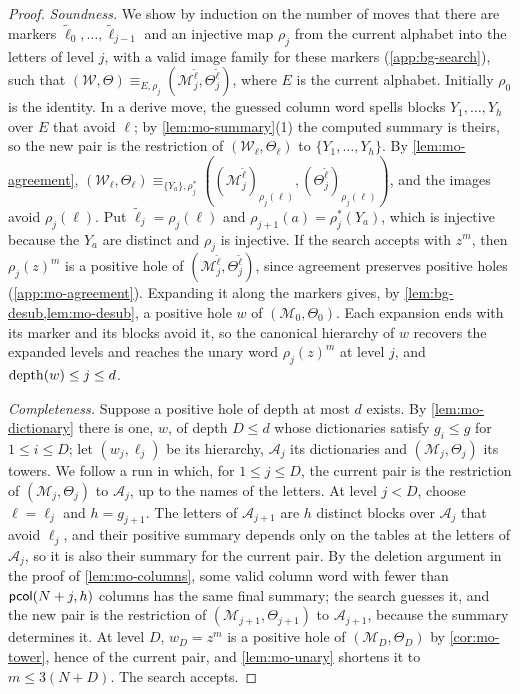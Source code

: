 \begin{proof}
\emph{Soundness.} We show by induction on the number of moves that there are
markers $\widetilde\ell_0,\ldots,\widetilde\ell_{j-1}$ and an injective map
$\rho_j$ from the current alphabet into the letters of level $j$, with a valid
image family for these markers (\cref{app:bg-search}), such that
$(\mathcal W,\Theta)\equiv_{E,\rho_j}(\mathcal M^{\widetilde{\boldsymbol\ell}}_j,
\Theta^{\widetilde{\boldsymbol\ell}}_j)$, where $E$ is the current alphabet.
Initially $\rho_0$ is the identity. In a derive move, the guessed column word
spells blocks $Y_1,\ldots,Y_h$ over $E$ that avoid $\ell$; by
\cref{lem:mo-summary}(1) the computed summary is theirs, so the new pair is the
restriction of $(\mathcal W_\ell,\Theta_\ell)$ to $\{Y_1,\ldots,Y_h\}$. By
\cref{lem:mo-agreement},
$(\mathcal W_\ell,\Theta_\ell)\equiv_{\{Y_a\},\rho_j^*}
((\mathcal M^{\widetilde{\boldsymbol\ell}}_j)_{\rho_j(\ell)},
(\Theta^{\widetilde{\boldsymbol\ell}}_j)_{\rho_j(\ell)})$, and the images avoid
$\rho_j(\ell)$. Put $\widetilde\ell_j=\rho_j(\ell)$ and
$\rho_{j+1}(a)=\rho_j^*(Y_a)$, which is injective because the $Y_a$ are
distinct and $\rho_j$ is injective. If the search accepts with $z^m$, then
$\rho_j(z)^m$ is a positive hole of $(\mathcal M^{\widetilde{\boldsymbol\ell}}_j,
\Theta^{\widetilde{\boldsymbol\ell}}_j)$, since agreement preserves positive
holes (\cref{app:mo-agreement}). Expanding it along the markers gives, by
\cref{lem:bg-desub,lem:mo-desub}, a positive hole $w$ of
$(\mathcal M_0,\Theta_0)$. Each expansion ends with its marker and its blocks
avoid it, so the canonical hierarchy of $w$ recovers the expanded levels and
reaches the unary word $\rho_j(z)^m$ at level $j$, and $\operatorname{depth}(w)\le j\le d$.

\emph{Completeness.} Suppose a positive hole of depth at most $d$ exists. By
\cref{lem:mo-dictionary} there is one, $w$, of depth $D\le d$ whose
dictionaries satisfy $g_i\le g$ for $1\le i\le D$; let $(w_j,\ell_j)$ be its
hierarchy, $\mathcal A_j$ its dictionaries and $(\mathcal M_j,\Theta_j)$ its
towers. We follow a run in which, for $1\le j\le D$, the current pair is the
restriction of $(\mathcal M_j,\Theta_j)$ to $\mathcal A_j$, up to the names of
the letters. At level $j<D$, choose $\ell=\ell_j$ and $h=g_{j+1}$. The letters
of $\mathcal A_{j+1}$ are $h$ distinct blocks over $\mathcal A_j$ that avoid
$\ell_j$, and their positive summary depends only on the tables at the letters
of $\mathcal A_j$, so it is also their summary for the current pair. By the
deletion argument in the proof of \cref{lem:mo-columns}, some valid column word
with fewer than $\mathsf{pcol}(N+j,h)$ columns has the same final summary; the
search guesses it, and the new pair is the restriction of
$(\mathcal M_{j+1},\Theta_{j+1})$ to $\mathcal A_{j+1}$, because the summary
determines it. At level $D$, $w_D=z^m$ is a positive hole of
$(\mathcal M_D,\Theta_D)$ by \cref{cor:mo-tower}, hence of the current pair, and
\cref{lem:mo-unary} shortens it to $m\le3(N+D)$. The search accepts.
\end{proof}

